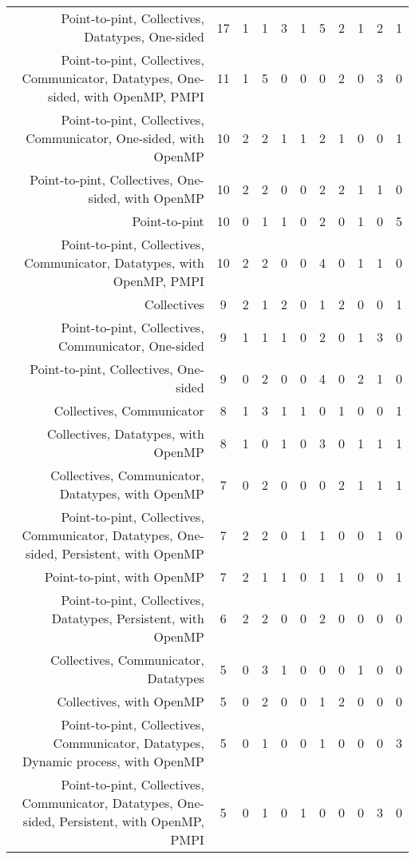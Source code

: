 {\begin{landscape}
\begin{longtable}[htb]{r|c|c|c|c|c|c|c|c|c|c}
{Point-to-pint, Collectives, Datatypes, One-sided} & 17 & 1 & 1 & 3 & 1 & 5 & 2 & 1 & 2 & 1 \\%
{Point-to-pint, Collectives, Communicator, Datatypes, One-sided, with OpenMP, PMPI} & 11 & 1 & 5 & 0 & 0 & 0 & 2 & 0 & 3 & 0 \\%
{Point-to-pint, Collectives, Communicator, One-sided, with OpenMP} & 10 & 2 & 2 & 1 & 1 & 2 & 1 & 0 & 0 & 1 \\%
{Point-to-pint, Collectives, One-sided, with OpenMP} & 10 & 2 & 2 & 0 & 0 & 2 & 2 & 1 & 1 & 0 \\%
{Point-to-pint} & 10 & 0 & 1 & 1 & 0 & 2 & 0 & 1 & 0 & 5 \\%
{Point-to-pint, Collectives, Communicator, Datatypes, with OpenMP, PMPI} & 10 & 2 & 2 & 0 & 0 & 4 & 0 & 1 & 1 & 0 \\%
{Collectives} & 9 & 2 & 1 & 2 & 0 & 1 & 2 & 0 & 0 & 1 \\%
{Point-to-pint, Collectives, Communicator, One-sided} & 9 & 1 & 1 & 1 & 0 & 2 & 0 & 1 & 3 & 0 \\%
{Point-to-pint, Collectives, One-sided} & 9 & 0 & 2 & 0 & 0 & 4 & 0 & 2 & 1 & 0 \\%
{Collectives, Communicator} & 8 & 1 & 3 & 1 & 1 & 0 & 1 & 0 & 0 & 1 \\%
{Collectives, Datatypes, with OpenMP} & 8 & 1 & 0 & 1 & 0 & 3 & 0 & 1 & 1 & 1 \\%
{Collectives, Communicator, Datatypes, with OpenMP} & 7 & 0 & 2 & 0 & 0 & 0 & 2 & 1 & 1 & 1 \\%
{Point-to-pint, Collectives, Communicator, Datatypes, One-sided, Persistent, with OpenMP} & 7 & 2 & 2 & 0 & 1 & 1 & 0 & 0 & 1 & 0 \\%
{Point-to-pint, with OpenMP} & 7 & 2 & 1 & 1 & 0 & 1 & 1 & 0 & 0 & 1 \\%
{Point-to-pint, Collectives, Datatypes, Persistent, with OpenMP} & 6 & 2 & 2 & 0 & 0 & 2 & 0 & 0 & 0 & 0 \\%
{Collectives, Communicator, Datatypes} & 5 & 0 & 3 & 1 & 0 & 0 & 0 & 1 & 0 & 0 \\%
{Collectives, with OpenMP} & 5 & 0 & 2 & 0 & 0 & 1 & 2 & 0 & 0 & 0 \\%
{Point-to-pint, Collectives, Communicator, Datatypes, Dynamic process, with OpenMP} & 5 & 0 & 1 & 0 & 0 & 1 & 0 & 0 & 0 & 3 \\%
{Point-to-pint, Collectives, Communicator, Datatypes, One-sided, Persistent, with OpenMP, PMPI} & 5 & 0 & 1 & 0 & 1 & 0 & 0 & 0 & 3 & 0 \\%

\end{longtable}
\end{landscape}}
